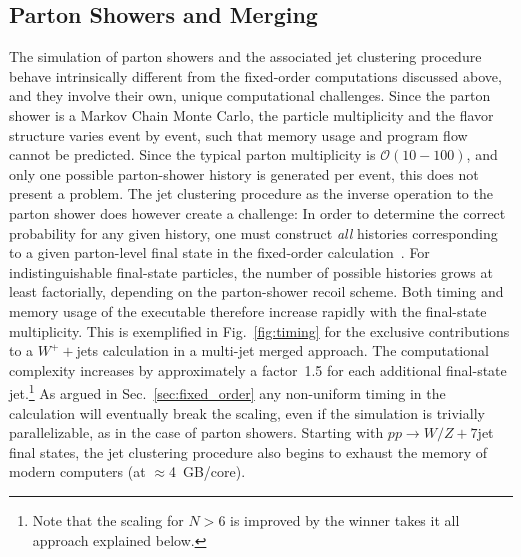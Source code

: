 \documentclass[aps,prd,twocolumn,fleqn,superscriptaddress,groupedaddress,nofootinbib,preprintnumbers]{revtex4}
\begin{document}
\subsection{Parton Showers and Merging}
\label{sec:parton_shower}
The simulation of parton showers and the associated jet clustering
procedure behave intrinsically different from the fixed-order
computations discussed above, and they involve their own, unique
computational challenges. Since the parton shower is a Markov Chain
Monte Carlo, the particle multiplicity and the flavor structure varies
event by event, such that memory usage and program flow cannot
be predicted. Since the typical parton multiplicity is
$\mathcal{O}(10-100)$, and only one possible parton-shower history
is generated per event, this does not present a problem.
The jet clustering procedure as the inverse operation to the parton shower
does however create a challenge:
In order to determine the correct probability for any given history,
one must construct \emph{all} histories corresponding to a given parton-level
final state in the fixed-order calculation~\cite{Andre:1997vh}.
For indistinguishable final-state particles, the number of possible
histories grows at least factorially, depending on the parton-shower
recoil scheme. Both timing and memory usage of the executable therefore
increase rapidly with the final-state multiplicity.
This is exemplified in Fig.~\ref{fig:timing} for the exclusive
contributions to a $W^++$jets calculation in a multi-jet merged approach.
The computational complexity increases by approximately a factor~1.5
for each additional final-state jet.\footnote{Note that
  the scaling for $N>6$ is improved by the winner takes it all
  approach explained below.}
As argued in Sec.~\ref{sec:fixed_order} any non-uniform timing
in the calculation will eventually break the scaling, even if the
simulation is trivially parallelizable, as in the case of parton showers.
Starting with $pp\to W/Z+7$jet final states, the jet clustering procedure
also begins to exhaust the memory of modern computers (at $\approx$4~GB/core).
\end{document}
